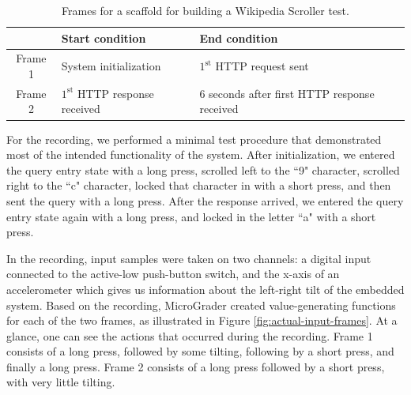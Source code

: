 \documentclass[12pt]{article}
\begin{document}
\begin{table}[ht]
\begin{center}
\caption{Frames for a scaffold for building a Wikipedia Scroller test.}
\begin{tabular}{c|ll}
& Start condition & End condition \\ \hline
Frame 1 & System initialization & $1^{\text{st}}$ HTTP request sent \\
Frame 2 & $1^{\text{st}}$ HTTP response received & 6 seconds after first HTTP response received \\ \hline
\end{tabular}
\label{table:frame-templates-2}
\end{center}
\end{table}

For the recording, we performed a minimal test procedure that demonstrated most of the intended functionality of the system.  After initialization, we entered the query entry state with a long press, scrolled left to the ``9" character, scrolled right to the ``c" character, locked that character in with a short press, and then sent the query with a long press.  After the response arrived, we entered the query entry state again with a long press, and locked in the letter ``a" with a short press.

In the recording, input samples were taken on two channels: a digital input connected to the active-low push-button switch, and the x-axis of an accelerometer which gives us information about the left-right tilt of the embedded system.  Based on the recording, MicroGrader created value-generating functions for each of the two frames, as illustrated in Figure \ref{fig:actual-input-frames}.  At a glance, one can see the actions that occurred during the recording. Frame 1 consists of a long press, followed by some tilting, following by a short press, and finally a long press.  Frame 2 consists of a long press followed by a short press, with very little tilting.
\end{document}
